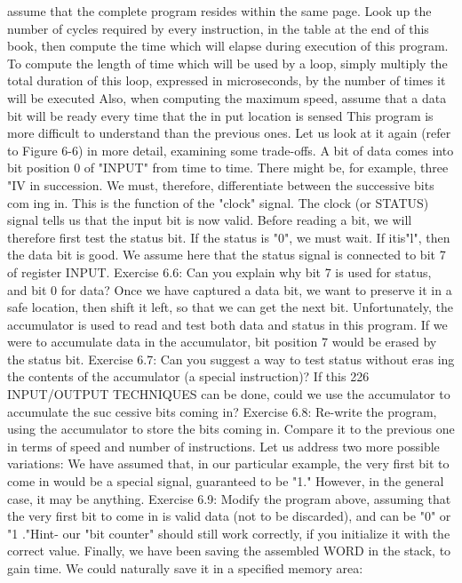 assume that the complete program resides within the same page.
Look up the number of cycles required by every instruction, in the
table at the end of this book, then compute the time which will
elapse during execution of this program. To compute the length
of time which will be used by a loop, simply multiply the total
duration of this loop, expressed in microseconds, by the number
of times it will be executed Also, when computing the maximum
speed, assume that a data bit will be ready every time that the in
put location is sensed
This program is more difficult to understand than the previous
ones. Let us look at it again (refer to Figure 6-6) in more detail,
examining some trade-offs.
A bit of data comes into bit position 0 of "INPUT" from
time to time. There might be, for example, three "IV in succession.
We must, therefore, differentiate between the successive bits com
ing in. This is the function of the "clock" signal.
The clock (or STATUS) signal tells us that the input bit is
now valid.
Before reading a bit, we will therefore first test the status bit.
If the status is "0", we must wait. If itis"l", then the data
bit is good.
We assume here that the status signal is connected to bit 7
of register INPUT.
Exercise 6.6: Can you explain why bit 7 is used for status, and
bit 0 for data?
Once we have captured a data bit, we want to preserve it in
a safe location, then shift it left, so that we can get the next bit.
Unfortunately, the accumulator is used to read and test both data
and status in this program. If we were to accumulate data in the
accumulator, bit position 7 would be erased by the status bit.
Exercise 6.7: Can you suggest a way to test status without eras
ing the contents of the accumulator (a special instruction)? If this
226
INPUT/OUTPUT TECHNIQUES
can be done, could we use the accumulator to accumulate the suc
cessive bits coming in?
Exercise 6.8: Re-write the program, using the accumulator to
store the bits coming in. Compare it to the previous one in terms
of speed and number of instructions.
Let us address two more possible variations:
We have assumed that, in our particular example, the very first bit to
come in would be a special signal, guaranteed to be "1." However, in
the general case, it may be anything.
Exercise 6.9: Modify the program above, assuming that the very
first bit to come in is valid data (not to be discarded), and can be
"0" or "1 ."Hint- our "bit counter" should still work correctly,
if you initialize it with the correct value.
Finally, we have been saving the assembled WORD in the stack, to
gain time. We could naturally save it in a specified memory area:

